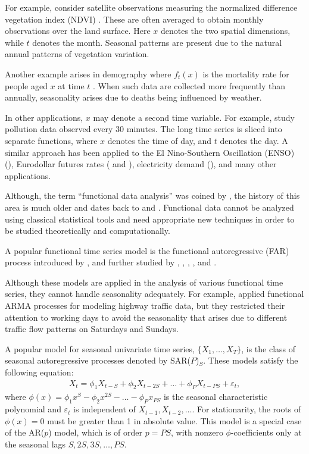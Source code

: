 \documentclass[11pt,a4paper]{article}
\numberwithin{equation}{section}
\begin{document}
For example, consider satellite observations measuring the normalized difference vegetation index (NDVI) \citep{he2018statistical}. These are often averaged to obtain monthly observations over the land surface. Here $x$ denotes the two spatial dimensions, while $t$ denotes the month. Seasonal patterns are present due to the natural annual patterns of vegetation variation.

Another example arises in demography where $f_t(x)$ is the mortality rate for people aged $x$ at time $t$ \citep{HU07}. When such data are collected more frequently than annually, seasonality arises due to deaths being influenced by weather.

In other applications, $x$ may denote a second time variable. For example, \citet{hormann2018testing} study pollution data observed every 30 minutes. The long time series is sliced into separate functions, where $x$ denotes the time of day, and $t$ denotes the day. A similar approach has been applied to the
 El Nino-Southern Oscillation (ENSO) (\citet{besse2000autoregressive}), Eurodollar futures rates (\citet{Kargin2008} and \citet{horvath2013estimation}), electricity demand (\citet{shang2013functional}), and many other applications.

Although, the term ``functional data analysis'' was coined by \citet{ramsay1982data}, the history of this area is much older and dates back to \citet{grenander1950stochastic} and \citet{rao1958some}. Functional data cannot be analyzed using classical statistical tools and need appropriate new techniques in order to be studied theoretically and computationally.

A popular functional time series model is the functional autoregressive (FAR) process introduced by \citet{Bosq2000}, and further studied by \citet{hormann2010weakly}, \citet{horvath2010testing}, \citet{horvath2012inference}, \citet{berkes2013weak}, \citet{hormann2013functional} and \citet{aue2015prediction}.

Although these models are applied in the analysis of various functional time series, they cannot handle seasonality adequately. For example, \citet{klepsch2017prediction} applied functional ARMA processes for modeling highway traffic data, but they restricted their attention to working days to avoid the seasonality that arises due to different traffic flow patterns on Saturdays and Sundays.

A popular model for seasonal univariate time series, $\{X_1,\dots,X_T\}$, is the class of seasonal autoregressive processes denoted by SAR($P$)$_S$. These models satisfy the following equation:
\begin{eqnarray*}
	X_t=\phi_1X_{t-S}+\phi_2X_{t-2S}+\dots+\phi_PX_{t-PS}+\varepsilon_t,
\end{eqnarray*}
where $\phi(x) = \phi_1x^{S}-\phi_2x^{2S}-\dots-\phi_Px_{PS}$ is the seasonal characteristic polynomial and $\varepsilon_t$ is independent of $X_{t-1}, X_{t-2}, \dots$. For stationarity, the roots of $\phi(x)=0$ must be greater than 1 in absolute value. This model is a special case of the AR($p$) model, which is of order $p = PS$, with nonzero $\phi$-coefficients only at the
seasonal lags $S, 2S, 3S,\dots, PS$.
\end{document}
